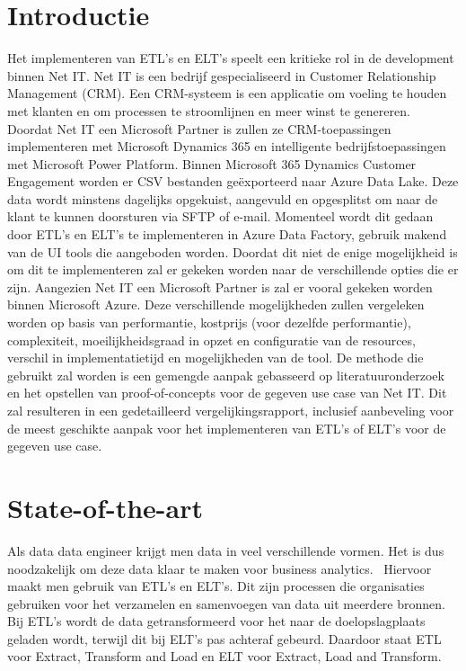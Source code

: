 
\section{Introductie}%
\label{sec:introductie}

Het implementeren van ETL's en ELT's speelt een kritieke rol in de development binnen Net IT. Net IT is een bedrijf gespecialiseerd in Customer Relationship Management (CRM). Een CRM-systeem is een applicatie om voeling te houden met klanten en om processen te stroomlijnen en meer winst te genereren. Doordat Net IT een Microsoft Partner is zullen ze CRM-toepassingen implementeren met Microsoft Dynamics 365 en intelligente bedrijfstoepassingen met Microsoft Power Platform. Binnen Microsoft 365 Dynamics Customer Engagement worden er CSV bestanden geëxporteerd naar Azure Data Lake. Deze data wordt minstens dagelijks opgekuist, aangevuld en opgesplitst om naar de klant te kunnen doorsturen via SFTP of e-mail. Momenteel wordt dit gedaan door ETL's en ELT's te implementeren in Azure Data Factory, gebruik makend van de UI tools die aangeboden worden. Doordat dit niet de enige mogelijkheid is om dit te implementeren zal er gekeken worden naar de verschillende opties die er zijn. Aangezien Net IT een Microsoft Partner is zal er vooral gekeken worden binnen Microsoft Azure. Deze verschillende mogelijkheden zullen vergeleken worden op basis van performantie, kostprijs (voor dezelfde performantie), complexiteit, moeilijkheidsgraad in opzet en configuratie van de resources, verschil in implementatietijd en mogelijkheden van de tool. De methode die gebruikt zal worden is een gemengde aanpak gebasseerd op literatuuronderzoek en het opstellen van proof-of-concepts voor de gegeven use case van Net IT. Dit zal resulteren in een gedetailleerd vergelijkingsrapport, inclusief aanbeveling voor de meest geschikte aanpak voor het implementeren van ETL's of ELT's voor de gegeven use case.

\section{State-of-the-art}%
\label{sec:state-of-the-art}

Als data data engineer krijgt men data in veel verschillende vormen. Het is dus noodzakelijk om deze data klaar te maken voor business analytics.~\autocite{Kromer2022} Hiervoor maakt men gebruik van ETL's en ELT's. Dit zijn processen die organisaties gebruiken voor het verzamelen en samenvoegen van data uit meerdere bronnen. Bij ETL's wordt de data getransformeerd voor het naar de doelopslagplaats geladen wordt, terwijl dit bij ELT's pas achteraf gebeurd. Daardoor staat ETL voor Extract, Transform and Load en ELT voor Extract, Load and Transform.~\autocite{Bartley2023} 

